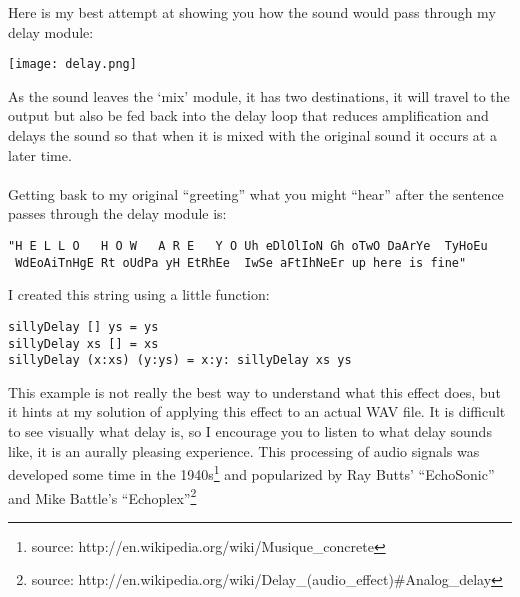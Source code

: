 \documentclass[12pt]{article}
\begin{document}
Here is my best attempt at showing you how the sound would pass through my delay module:
\begin{center}
\texttt{[image: delay.png]}
\end{center}
%
As the sound leaves the `mix' module, it has two destinations, it will travel to the output but also be fed back into the delay loop that reduces amplification and delays the sound so that when it is mixed with the original sound it occurs at a later time.
\\ \\
Getting bask to my original ``greeting'' what you might ``hear'' after the sentence passes through the delay module is:
\begin{verbatim}
"H E L L O   H O W   A R E   Y O Uh eDlOlIoN Gh oTwO DaArYe  TyHoEu  
 WdEoAiTnHgE Rt oUdPa yH EtRhEe  IwSe aFtIhNeEr up here is fine"
\end{verbatim}
I created this string using a little function:
\begin{verbatim}
sillyDelay [] ys = ys
sillyDelay xs [] = xs
sillyDelay (x:xs) (y:ys) = x:y: sillyDelay xs ys
\end{verbatim}
This example is not really the best way to understand what this effect does, but it hints at my solution of applying this effect to an actual WAV file. It is difficult to see visually what delay is, so I encourage you to listen to what delay sounds like, it is an aurally pleasing experience. This processing of audio signals was developed some time in the 1940s\footnote{source: http://en.wikipedia.org/wiki/Musique\_concrete} and popularized by Ray Butts' ``EchoSonic'' and Mike Battle's ``Echoplex''\footnote{source: http://en.wikipedia.org/wiki/Delay\_(audio\_effect)\#Analog\_delay}
\end{document}
